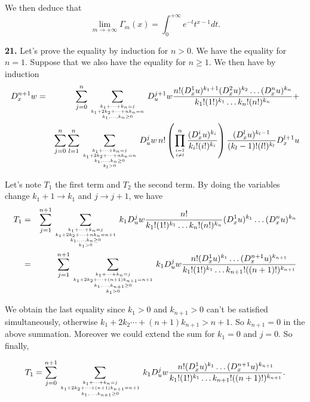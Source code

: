 \documentclass[a4paper,12pt]{article}
\newcommand{\newpar}[1]{\bigskip \noindent \textbf{#1.}}
\newcommand{\ra}{\rightarrow}
\begin{document}
We then deduce that
\[ \lim_{m\to +\infty} \Gamma_m(x) = \int_0^{+\infty} e^{-t}
t^{x-1}dt.\]

\newpar{21}  Let's prove the equality by induction for $n>0$.  We have
the equality for $n=1$.  Suppose that we also have the equality for
$n\ge 1$.  We then have by induction
\begin{eqnarray*}
  D_x^{n+1}w &=& \sum_{j=0}^n \sum_{k_1+\cdots+k_n=j \atop
    {k_1+2k_2+\cdots+nk_n = n \atop k_1,\ldots,k_n \ge 0}} D_u^{j+1} w
  \frac{n! (D_x^1 u)^{k_1+1} (D_x^2 u)^{k_2} \ldots (D_x^n
    u)^{k_n}}{k_1!(1!)^{k_1}\ldots k_n! (n!)^{k_n}} +\\
  && \sum_{j=0}^n \sum_{l=1}^n \sum_{k_1+\cdots+k_n = j \atop
    {k_1+2k_2+\cdots+nk_n = n \atop {k_1, \ldots, k_n \ge 0
  \atop k_l > 0}}} D_u^j
  w\,n! \left(\prod_{i=1\atop i\not=l}^n
  \frac{(D_x^iu)^{k_i}}{k_i!(i!)^{k_i}}\right)
  \frac{(D_x^lu)^{k_l-1}}{(k_l-1)!(l!)^{k_l}} D_x^{l+1}u
\end{eqnarray*}

Let's note $T_1$ the first term and $T_2$ the second term.  By doing
the variables change $k_1+1 \ra k_1$ and $j\ra j+1$, we have
\begin{eqnarray*}
  T_1 &=& \sum_{j=1}^{n+1} \sum_{k_1 + \cdots + k_n = j \atop {
      k_1 + 2 k_2 + \cdots + n k_n = n+1 \atop {k_1, \ldots, k_n \ge
        0 \atop k_1 > 0}}} k_1 D_u^jw \frac{n!}{k_1!(1!)^{k_1} \ldots
    k_n!(n!)^{k_n}} (D_x^1u)^{k_1} \ldots (D_x^nu)^{k_n} \\
  &=& \sum_{j=1}^{n+1} \sum_{k_1 + \cdots + k_n = j \atop {
      k_1 + 2 k_2 + \cdots + (n+1) k_{n+1} = n+1 \atop {k_1, \ldots, k_{n+1} \ge
        0 \atop k_1 > 0}}} k_1 D_u^jw \frac{n!(D_x^1u)^{k_1} \ldots
    (D_x^{n+1}u)^{k_{n+1}}}{k_1!(1!)^{k_1} \ldots
    k_{n+1}!((n+1)!)^{k_{n+1}}}
\end{eqnarray*}

We obtain the last equality since $k_1 > 0$ and $k_{n+1} > 0$ can't be
satisfied simultaneously, otherwise $k_1 + 2 k_2 \cdots +
(n+1)k_{n+1} > n+1$.  So $k_{n+1} = 0$ in the above summation.
Moreover we could extend the sum for $k_1 = 0$ and $j=0$.  So finally,

\[  T_1 = \sum_{j=0}^{n+1} \sum_{k_1 + \cdots + k_n = j \atop {
      k_1 + 2 k_2 + \cdots + (n+1) k_{n+1} = n+1 \atop {k_1, \ldots, k_{n+1} \ge
        0}}} k_1 D_u^jw \frac{n!(D_x^1u)^{k_1} \ldots
    (D_x^{n+1}u)^{k_{n+1}}}{k_1!(1!)^{k_1} \ldots
    k_{n+1}!((n+1)!)^{k_{n+1}}}.\]
\end{document}
